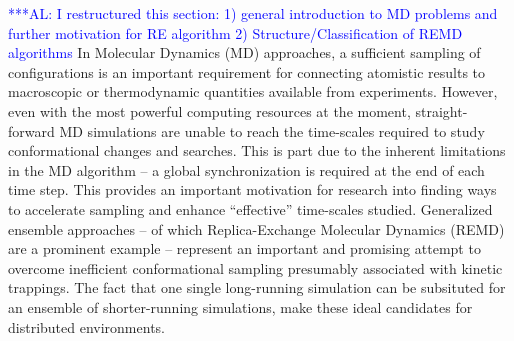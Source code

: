 \documentclass[conference,final]{IEEEtran}
\newcommand{\alnote}[1]{ {\textcolor{blue} { ***AL: #1 }}}
\newcommand{\jhanote}[1]{ {\textcolor{red} { ***SJ: #1 }}}
\newcommand{\alnote}[1]{}
\newcommand{\jhanote}[1]{}
\newcommand{\up}{\vspace*{-1em}}
\begin{document}

\up
{}
\alnote{I restructured this section: 1) general introduction to MD
  problems and further motivation for RE algorithm 2)
  Structure/Classification of REMD algorithms} 
\up In Molecular
Dynamics (MD) approaches, a sufficient sampling of configurations is
an important requirement for connecting atomistic results to
macroscopic or thermodynamic quantities available from experiments.
However, even with the most powerful computing resources at the
moment, straight-forward MD simulations are unable to reach the
time-scales required to study conformational changes and
searches. This is part due to the inherent limitations in the MD
algorithm -- a global synchronization is required at the end of each
time step.  This provides an important motivation for research into
finding ways to accelerate sampling and enhance ``effective''
time-scales studied. Generalized ensemble approaches -- of which
Replica-Exchange Molecular Dynamics (REMD)~\cite{Sugita:1999rm} are a
prominent example -- represent an important and promising attempt to
overcome inefficient conformational sampling presumably associated
with kinetic trappings.  The fact that one single long-running
simulation can be subsituted for an ensemble of shorter-running
simulations, make these ideal candidates for distributed environments.

\end{document}
